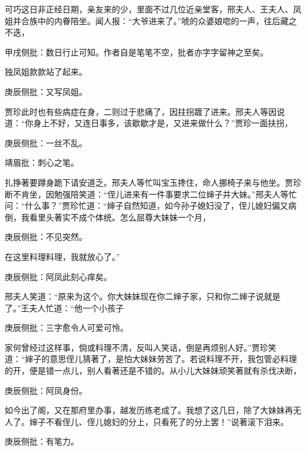 \begin{parag}
    可巧这日非正经日期，亲友来的少，里面不过几位近亲堂客，邢夫人、王夫人、凤姐并合族中的内眷陪坐。闻人报：“大爷进来了。”唬的众婆娘唿的一声，往后藏之不迭，\begin{note}甲戌侧批：数日行止可知。作者自是笔笔不空，批者亦字字留神之至矣。\end{note}独凤姐款款站了起来。\begin{note}庚辰侧批：又写凤姐。\end{note}贾珍此时也有些病症在身，二则过于悲痛了，因拄拐踱了进来。邢夫人等因说道：“你身上不好，又连日事多，该歇歇才是，又进来做什么？”贾珍一面扶拐，\begin{note}庚辰侧批：一丝不乱。\end{note}\begin{note}靖眉批：刺心之笔。\end{note}扎挣著要蹲身跪下请安道乏。邢夫人等忙叫宝玉搀住，命人挪椅子来与他坐。贾珍断不肯坐，因勉强陪笑道：“侄儿进来有一件事要求二位婶子并大妹。”邢夫人等忙问：“什么事？”贾珍忙道：“婶子自然知道，如今孙子媳妇没了，侄儿媳妇偏又病倒，我看里头著实不成个体统。怎么屈尊大妹妹一个月，\begin{note}庚辰侧批：不见突然。\end{note}在这里料理料理，我就放心了。”\begin{note}庚辰侧批：阿凤此刻心痒矣。\end{note}邢夫人笑道：“原来为这个。你大妹妹现在你二婶子家，只和你二婶子说就是了。”王夫人忙道：“他一个小孩子\begin{note}庚辰侧批：三字愈令人可爱可怜。\end{note}家何曾经过这样事，倘或料理不清，反叫人笑话，倒是再烦别人好。”贾珍笑道：“婶子的意思侄儿猜著了，是怕大妹妹劳苦了。若说料理不开，我包管必料理的开，便是错一点儿，别人看著还是不错的。从小儿大妹妹顽笑著就有杀伐决断，\begin{note}庚辰侧批：阿凤身份。\end{note}如今出了阁，又在那府里办事，越发历练老成了。我想了这几日，除了大妹妹再无人了。婶子不看侄儿、侄儿媳妇的分上，只看死了的分上罢！”说著滚下泪来。\begin{note}庚辰侧批：有笔力。\end{note}
\end{parag}


